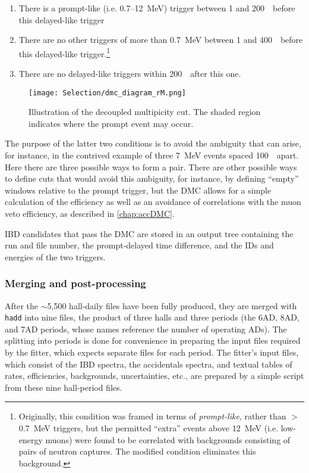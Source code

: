 \documentclass[../thesis.tex]{subfiles}
\begin{document}
\begin{enumerate}
\item There is a prompt-like (i.e. 0.7--12~MeV) trigger between 1 and 200~\us\ before this delayed-like trigger
\item There are no other triggers of more than 0.7~MeV between 1 and 400~\us\ before this delayed-like trigger.\footnote{Originally, this condition was framed in terms of \emph{prompt-like}, rather than $>$0.7~MeV triggers, but the permitted ``extra'' events above 12~MeV (i.e. low-energy muons) were found to be correlated with backgrounds consisting of pairs of neutron captures. The modified condition eliminates this background.}
\item There are no delayed-like triggers within 200~\us\ after this one.
\end{enumerate}

\begin{figure}[h]
  \texttt{[image: Selection/dmc\_diagram\_rM.png]}
  \caption{Illustration of the decoupled multipicity cut. The shaded region indicates where the prompt event may occur.}
  \label{fig:dmc_diagram_rM}
\end{figure}

The purpose of the latter two conditions is to avoid the ambiguity that can arise, for instance, in the contrived example of three 7~MeV events spaced 100~\us\ apart. Here there are three possible ways to form a pair. There are other possible ways to define cuts that would avoid this ambiguity, for instance, by defining ``empty'' windows relative to the prompt trigger, but the DMC allows for a simple calculation of the efficiency as well as an avoidance of correlations with the muon veto efficiency, as described in \autoref{chap:accDMC}.

IBD candidates that pass the DMC are stored in an output tree containing the run and file number, the prompt-delayed time difference, and the IDs and energies of the two triggers.

\subsubsection{Merging and post-processing}
\label{sec:selMergingTwo}

After the $\sim$5,500 hall-daily files have been fully produced, they are merged with \texttt{hadd} into nine files, the product of three halls and three periods (the 6AD, 8AD, and 7AD periods, whose names reference the number of operating ADs). The splitting into periods is done for convenience in preparing the input files required by the fitter, which expects separate files for each period. The fitter's input files, which consist of the IBD spectra, the accidentals spectra, and textual tables of rates, efficiencies, backgrounds, uncertainties, etc., are prepared by a simple script from these nine hall-period files.
\end{document}
